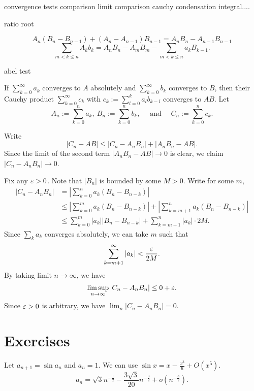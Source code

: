 \documentclass{../../large}
\begin{document}
convergence tests
comparison
limit comparison
cauchy condensation
integral....

ratio
root


\begin{prb}
\[A_n(B_n-B_{n-1})+(A_n-A_{n-1})B_{n-1}=A_nB_n-A_{n-1}B_{n-1}\]
\[\sum_{m<k\le n}A_kb_k=A_nB_n-A_mB_m-\sum_{m<k\le n}a_kB_{k-1}.\]
\end{prb}

abel test
\begin{prb}
\end{prb}


\begin{prb}
If $\sum_{k=0}^\infty a_k$ converges to $A$ absolutely and $\sum_{k=0}^\infty b_k$ converges to $B$, then their Cauchy product $\sum_{k=0}^\infty c_k$ with $c_k:=\sum_{l=0}^ka_lb_{k-l}$ converges to $AB$.
Let
\[A_n:=\sum_{k=0}^na_k,\ B_n:=\sum_{k=0}^nb_k,\quad\text{ and }\quad C_n:=\sum_{k=0}^nc_k.\]
\end{prb}
\begin{pf}
Write
\[|C_n-AB|\le|C_n-A_nB_n|+|A_nB_n-AB|.\]
Since the limit of the second term $|A_nB_n-AB|\to0$ is clear, we claim $|C_n-A_nB_n|\to0$.

Fix any $\varepsilon>0$.
Note that $|B_n|$ is bounded by some $M>0$.
Write for some $m$,
\begin{align*}
|C_n-A_nB_n|
&=|\sum_{k=0}^na_k(B_n-B_{n-k})|\\
&\le|\sum_{k=0}^ma_k(B_n-B_{n-k})|+|\sum_{k=m+1}^na_k(B_n-B_{n-k})|\\
&\le\sum_{k=0}^m|a_k||B_n-B_{n-k}|+\sum_{k=m+1}^n|a_k|\cdot2M.
\end{align*}
Since $\sum_ka_k$ converges absolutely, we can take $m$ such that
\[\sum_{k=m+1}^\infty|a_k|<\frac{\varepsilon}{2M}.\]
By taking limit $n\to\infty$, we have
\[\limsup_{n\to\infty}|C_n-A_nB_n|\le0+\varepsilon.\]
Since $\varepsilon>0$ is arbitrary, we have $\lim_n|C_n-A_nB_n|=0$.

\end{pf}




\section*{Exercises}
\begin{prb}

\end{prb}
\begin{prb}
Let $a_{n+1}=\sin a_n$ and $a_n=1$.
We can use $\sin x=x-\frac{x^3}6+O(x^5)$.
\[a_n=\sqrt3n^{-\frac12}-\frac{3\sqrt3}{20}n^{-\frac32}+o(n^{-\frac32}).\]
\end{prb}
\end{document}
